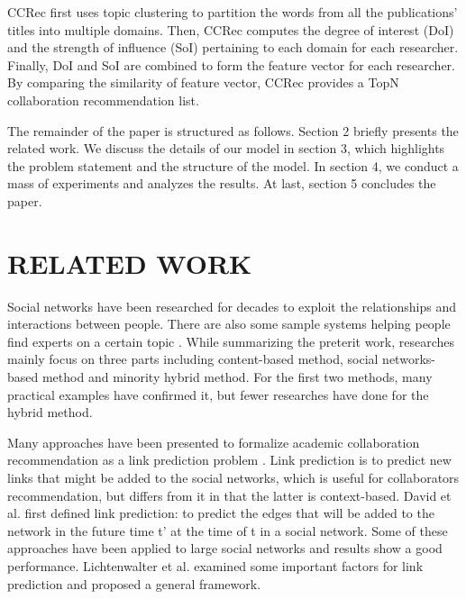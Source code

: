 \documentclass{acm_proc_article-sp}
\begin{document}
CCRec first uses topic clustering \cite{pan2010research} \cite{pham2011clustering} to partition the words from all the publications' titles into multiple domains. Then, CCRec computes the degree of interest (DoI) and the strength of influence (SoI) pertaining to each domain for each researcher. Finally, DoI and SoI are combined to form the feature vector for each researcher. By comparing the similarity of feature vector, CCRec provides a TopN collaboration recommendation list.

The remainder of the paper is structured as follows. Section 2 briefly presents the related work. We discuss the details of our model in section 3, which highlights the problem statement and the structure of the model. In section 4, we conduct a mass of experiments and analyzes the results. At last, section 5 concludes the paper.

\section{RELATED WORK}
Social networks have been researched for decades to exploit the relationships and interactions between people. There are also some sample systems helping people find experts on a certain topic \cite{freyne2010social}. While summarizing the preterit work, researches \cite{lee2011recommending} mainly focus on three parts including content-based method, social networks-based method and minority hybrid method. For the first two methods, many practical examples have confirmed it, but fewer researches have done for the hybrid method.

Many approaches have been presented to formalize academic collaboration recommendation as a link prediction problem \cite{chen2012discovering} \cite{sun2011co}. Link prediction is to predict new links that might be added to the social networks, which is useful for collaborators recommendation, but differs from it in that the latter is context-based. David et al. \cite{liben2007link} first defined link prediction: to predict the edges that will be added to the network in the future time t' at the time of t in a social network. Some of these approaches have been applied to large social networks and results show a good performance. Lichtenwalter et al. \cite{lichtenwalter2010new} examined some important factors for link prediction and proposed a general framework.
\end{document}
